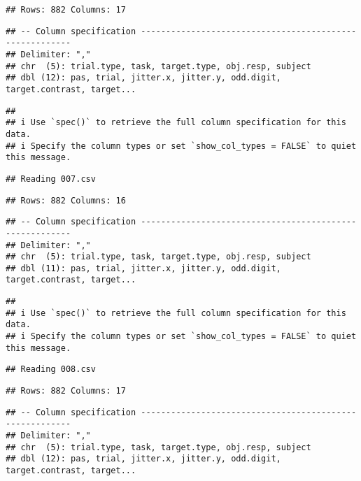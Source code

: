 \documentclass[
]{article}
\begin{document}
\begin{verbatim}
## Rows: 882 Columns: 17
\end{verbatim}

\begin{verbatim}
## -- Column specification --------------------------------------------------------
## Delimiter: ","
## chr  (5): trial.type, task, target.type, obj.resp, subject
## dbl (12): pas, trial, jitter.x, jitter.y, odd.digit, target.contrast, target...
\end{verbatim}

\begin{verbatim}
## 
## i Use `spec()` to retrieve the full column specification for this data.
## i Specify the column types or set `show_col_types = FALSE` to quiet this message.
\end{verbatim}

\begin{verbatim}
## Reading 007.csv
\end{verbatim}

\begin{verbatim}
## Rows: 882 Columns: 16
\end{verbatim}

\begin{verbatim}
## -- Column specification --------------------------------------------------------
## Delimiter: ","
## chr  (5): trial.type, task, target.type, obj.resp, subject
## dbl (11): pas, trial, jitter.x, jitter.y, odd.digit, target.contrast, target...
\end{verbatim}

\begin{verbatim}
## 
## i Use `spec()` to retrieve the full column specification for this data.
## i Specify the column types or set `show_col_types = FALSE` to quiet this message.
\end{verbatim}

\begin{verbatim}
## Reading 008.csv
\end{verbatim}

\begin{verbatim}
## Rows: 882 Columns: 17
\end{verbatim}

\begin{verbatim}
## -- Column specification --------------------------------------------------------
## Delimiter: ","
## chr  (5): trial.type, task, target.type, obj.resp, subject
## dbl (12): pas, trial, jitter.x, jitter.y, odd.digit, target.contrast, target...
\end{verbatim}
\end{document}
